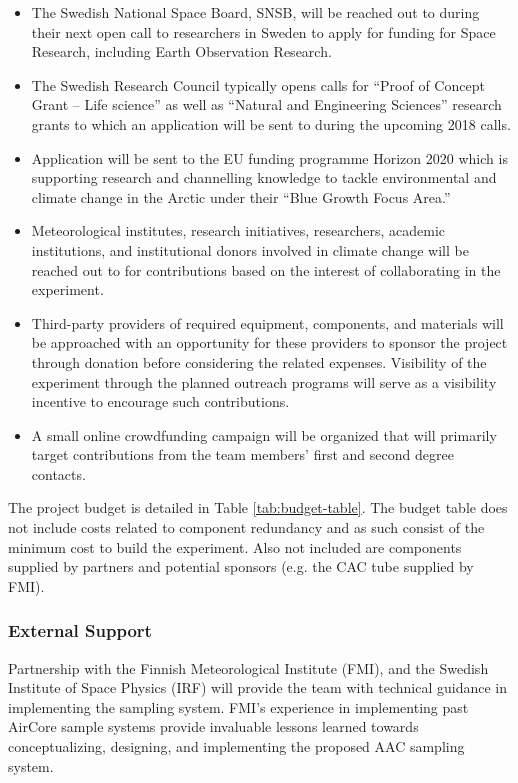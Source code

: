 \begin{itemize}
    \item The Swedish National Space Board, SNSB, will be reached out to during their next open call to researchers in Sweden to apply for funding for Space Research, including Earth Observation Research.
    \item The Swedish Research Council typically opens calls for \enquote{Proof of Concept Grant – Life science} as well as \enquote{Natural and Engineering Sciences} research grants to which an application will be sent to during the upcoming 2018 calls.
    \item Application will be sent to the EU funding programme Horizon 2020 which is supporting research and channelling knowledge to tackle environmental and climate change in the Arctic under their \enquote{Blue Growth Focus Area.}
    \item Meteorological institutes, research initiatives, researchers, academic institutions, and institutional donors involved in climate change will be reached out to for contributions based on the interest of collaborating in the experiment.
    \item Third-party providers of required equipment, components, and materials will be approached with an opportunity for these providers to sponsor the project through donation before considering the related expenses. Visibility of the experiment through the planned outreach programs will serve as a visibility incentive to encourage such contributions.
    \item A small online crowdfunding campaign will be organized that will primarily target contributions from the team members' first and second degree contacts.
\end{itemize}

The project budget is detailed in Table \ref{tab:budget-table}. The budget table does not include costs related to component redundancy and as such consist of the minimum cost to build the experiment. Also not included are components supplied by partners and potential sponsors (e.g. the CAC tube supplied by FMI).

\pagebreak



\subsubsection{External Support}

Partnership with the Finnish Meteorological Institute (FMI), and the Swedish Institute of Space Physics (IRF) will provide the team with technical guidance in implementing the sampling system. FMI’s experience in implementing past AirCore sample systems provide invaluable lessons learned towards conceptualizing, designing, and implementing the proposed AAC sampling system.

